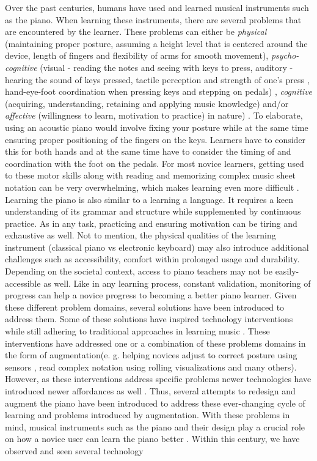 \documentclass[sigconf, screen, review]{acmart}
\begin{document}
Over the past centuries, humans have used and learned musical instruments such as the piano. When learning these instruments, there are several problems that are encountered by the learner. These problems can either be \textit{physical} (maintaining proper posture, assuming a height level that is centered around the device, length of fingers and flexibility of arms for smooth movement), \textit{psycho-cognitive} (visual - reading the notes and seeing with keys to press, auditory - hearing the sound of keys pressed, tactile perception and strength of one's press \cite{conklin1987piano}, hand-eye-foot coordination when pressing keys and stepping on pedals) \cite{simpson1966classification}, \textit{cognitive} (acquiring, understanding, retaining and applying music knowledge) \cite{hanna2007new} and/or \textit{affective} (willingness to learn, motivation to practice) in nature) \cite{mccarthy2002music, burns2020using}. To elaborate, using an acoustic piano would involve fixing your posture while at the same time ensuring proper positioning of the fingers on the keys. Learners have to consider this for both hands and at the same time have to consider the timing of and coordination with the foot on the pedals. For most novice learners, getting used to these motor skills along with reading and memorizing complex music sheet notation can be very overwhelming, which makes learning even more difficult \cite{highben2004effects}. Learning the piano is also similar to a learning a language. It requires a keen understanding of its grammar and structure while supplemented by continuous practice. As in any task, practicing and ensuring motivation can be tiring and exhaustive as well. Not to mention, the physical qualities of the learning instrument (classical piano vs electronic keyboard) may also introduce additional challenges such as accessibility, comfort within prolonged usage and durability. Depending on the societal context, access to piano teachers may not be easily-accessible as well. Like in any learning process, constant validation, monitoring of progress can help a novice progress to becoming a better piano learner. Given these different problem domains, several solutions have been introduced to address them. Some of these solutions have inspired technology interventions while still adhering to traditional approaches in learning music \cite{howard1996kodaly, burns2020using, blackshaw2020wearing, anggoro2020study, comeau2012playing}.  These interventions have addressed one or a combination of these problems domains in the form of augmentation(e. g. helping novices adjust to correct posture using sensors \cite{xiao2010mirrorfugue}, read complex notation using rolling visualizations \cite{ciuha2010visualization} and many others). However, as these interventions address specific problems newer technologies have introduced newer affordances as well \cite{dede1996evolution}. Thus, several attempts to redesign and augment the piano have been introduced to address these ever-changing cycle of learning and problems introduced by augmentation. With these problems in mind, musical instruments such as the piano and their design play a crucial role on how a novice user can learn the piano better \cite{gillespie1994virtual}. Within this century, we have observed and seen several technology 
\end{document}
